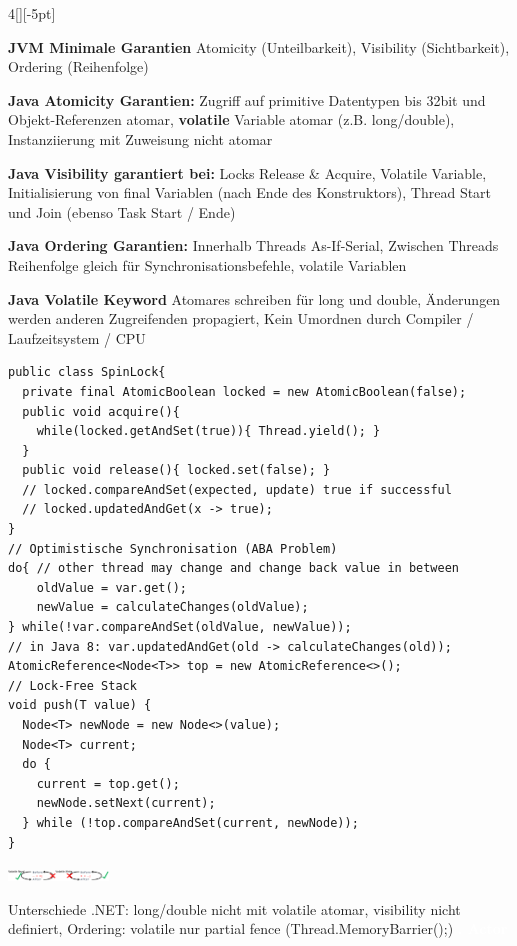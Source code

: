\documentclass[%
	pdftex,%
	a4paper,%
	landscape,%
	ngerman,
	oneside,%
	6pt,%
	halfparskip,%
]{scrbook}
\newenvironment{mainbox}{%
  \def\FrameCommand{\fboxrule 1px \fcolorbox{black}{spec_blue}}%
  \MakeFramed {\advance\hsize-\width \FrameRestore}}%
 {\endMakeFramed}
\newcommand{\maintopic}[1]{\setcounter{subtopicenum}{0}\setcounter{subsubtopicenum}{0}\vspace{-4px}\begin{mainbox}\textcolor{white}{\textbf{\large{\stepcounter{maintopicenum}\Roman{maintopicenum}. #1}}}\end{mainbox}\vspace{-4px}}
\newenvironment{tight-itemize}
{ \begin{itemize}[leftmargin=*, nosep]
    \setlength{\itemsep}{0px}
    \setlength{\parskip}{0px}
    \setlength{\parsep}{0px}  }
{ \end{itemize}                  }
\begin{document}
\begin{multicols}{4}[][-5pt]
\begin{tight-itemize}
    \item{\textbf{JVM Minimale Garantien} Atomicity (Unteilbarkeit), Visibility (Sichtbarkeit), Ordering (Reihenfolge)}
    \item{\textbf{Java Atomicity Garantien:} Zugriff auf primitive Datentypen bis 32bit und Objekt-Referenzen atomar, \textbf{volatile} Variable atomar (z.B. long/double), Instanziierung mit Zuweisung nicht atomar}
    \item{\textbf{Java Visibility garantiert bei:} Locks Release \& Acquire, Volatile Variable, Initialisierung von final Variablen (nach Ende des Konstruktors), Thread Start und Join (ebenso Task Start / Ende)}
    \item{\textbf{Java Ordering Garantien:} Innerhalb Threads As-If-Serial, Zwischen Threads Reihenfolge gleich für Synchronisationsbefehle, volatile Variablen}
    \item{\textbf{Java Volatile Keyword} Atomares schreiben für long und double, Änderungen werden anderen Zugreifenden propagiert, Kein Umordnen durch Compiler / Laufzeitsystem / CPU}
\end{tight-itemize}
\begin{lstlisting}
public class SpinLock{
  private final AtomicBoolean locked = new AtomicBoolean(false);
  public void acquire(){
    while(locked.getAndSet(true)){ Thread.yield(); }
  }
  public void release(){ locked.set(false); }
  // locked.compareAndSet(expected, update) true if successful
  // locked.updatedAndGet(x -> true);
}
// Optimistische Synchronisation (ABA Problem)
do{ // other thread may change and change back value in between
    oldValue = var.get();
    newValue = calculateChanges(oldValue);
} while(!var.compareAndSet(oldValue, newValue));
// in Java 8: var.updatedAndGet(old -> calculateChanges(old));
AtomicReference<Node<T>> top = new AtomicReference<>();
// Lock-Free Stack
void push(T value) {
  Node<T> newNode = new Node<>(value);
  Node<T> current;
  do {
    current = top.get();
    newNode.setNext(current);
  } while (!top.compareAndSet(current, newNode));
}
\end{lstlisting}
\begin{center}
    \includegraphics[width=0.2\textwidth]{img/volatile.png}
\end{center}
Unterschiede .NET: long/double nicht mit volatile atomar, visibility nicht definiert, Ordering: volatile nur partial fence (Thread.MemoryBarrier();)
\maintopic{Actor}

\end{multicols}
\end{document}
